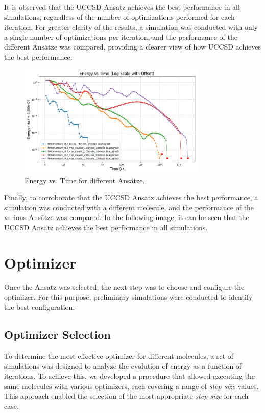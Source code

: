 It is observed that the UCCSD Ansatz achieves the best performance in all simulations, regardless of the number of optimizations performed for each iteration. For greater clarity of the results, a simulation was conducted with only a single number of optimizations per iteration, and the performance of the different Ansätze was compared, providing a clearer view of how UCCSD achieves the best performance.

\begin{figure}[H]
  \centering
  \includegraphics[width=0.8\textwidth]{data/Anzatz/results_ansatz_lyers/energy_vs_time_log_offset.png}
  \caption{Energy vs. Time for different Ansätze.}
  \label{fig:ansatz_layers}
\end{figure}

Finally, to corroborate that the UCCSD Ansatz achieves the best performance, a simulation was conducted with a different molecule, and the performance of the various Ansätze was compared. In the following image, it can be seen that the UCCSD Ansatz achieves the best performance in all simulations.

\section{Optimizer}

Once the Ansatz was selected, the next step was to choose and configure the optimizer. For this purpose, preliminary simulations were conducted to identify the best configuration.

\subsection{Optimizer Selection}
To determine the most effective optimizer for different molecules, a set of simulations was designed to analyze the evolution of energy as a function of iterations. To achieve this, we developed a procedure that allowed executing the same molecules with various optimizers, each covering a range of \emph{step size} values. This approach enabled the selection of the most appropriate \emph{step size} for each case.

